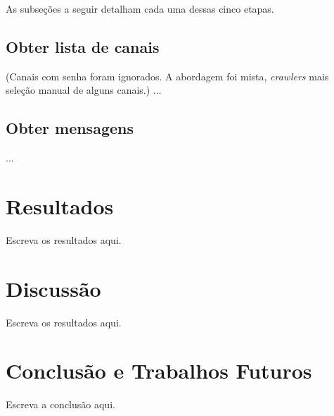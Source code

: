 \documentclass[12pt]{article}
\begin{document}
As subseções a seguir detalham cada uma dessas cinco etapas.

\subsection{Obter lista de canais}

(Canais com senha foram ignorados. A abordagem foi mista, \textit{crawlers}
mais seleção manual de alguns canais.) ...

\subsection{Obter mensagens}

...

\section{Resultados} \label{sec:res}

Escreva os resultados aqui.

\section{Discussão} \label{sec:disc}

Escreva os resultados aqui.


\section{Conclusão e Trabalhos Futuros} \label{sec: concl}

Escreva a conclusão aqui.



\end{document}
